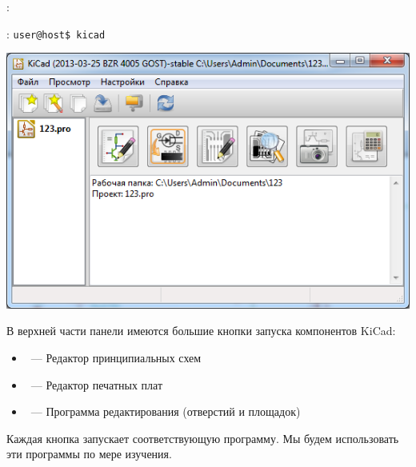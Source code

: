 \win: 

\linux: \verb|user@host$ kicad|

\bigskip
\includegraphics[height=0.8\textheight]{kicad/projman.png}

\bigskip
В верхней части панели   имеются большие
кнопки запуска компонентов KiCad:

\begin{itemize}
\item{}
\ --- Редактор принципиальных схем
\item{}
\ --- Редактор печатных плат
\item{}
\ --- Программа редактирования 
(отверстий и площадок)
\end{itemize}

Каждая кнопка запускает соответствующую программу. Мы будем использовать эти
программы по мере изучения.
